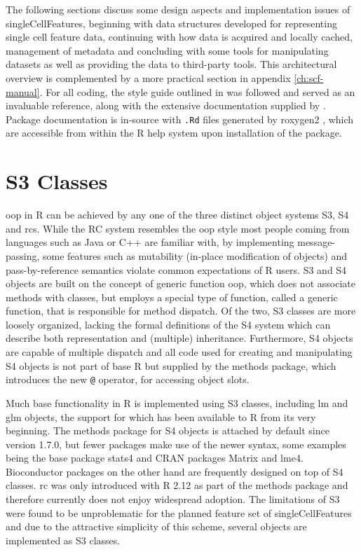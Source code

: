 The following sections discuss some design aspects and implementation issues of singleCellFeatures, beginning with data structures developed for representing single cell feature data, continuing with how data is acquired and locally cached, management of metadata and concluding with some tools for manipulating datasets as well as providing the data to third-party tools. This architectural overview is complemented by a more practical section in appendix \ref{ch:scf-manual}. For all coding, the style guide outlined in \cite{Wickham2014} was followed and \cite{Wickham2015} served as an invaluable reference, along with the extensive documentation supplied by \cite{RCoreTeam2015}. Package documentation is in-source with \texttt{.Rd} files generated by roxygen2 \citep{Wickham2015a}, which are accessible from within the R help system upon installation of the package.

\section{S3 Classes}
\label{sec:s3-objects}
\Gls{oop} in R can be achieved by any one of the three distinct object systems S3, S4 and \glspl{rc}. While the RC system resembles the \gls{oop} style most people coming from languages such as Java or C++ are familiar with, by implementing message-passing, some features such as mutability (in-place modification of objects) and pass-by-reference semantics violate common expectations of R users. S3 and S4 objects are built on the concept of generic function \gls{oop}, which does not associate methods with classes, but employs a special type of function, called a generic function, that is responsible for method dispatch. Of the two, S3 classes are more loosely organized, lacking the formal definitions of the S4 system which can describe both representation and (multiple) inheritance. Furthermore, S4 objects are capable of multiple dispatch and all code used for creating and manipulating S4 objects is not part of base R but supplied by the methods package, which introduces the new \texttt{@} operator, for accessing object slots.

Much base functionality in R is implemented using S3 classes, including lm and glm objects, the support for which has been available to R from its very beginning. The methods package for S4 objects is attached by default since version 1.7.0, but fewer packages make use of the newer syntax, some examples being the base package stats4 and CRAN packages Matrix and lme4. Bioconductor packages on the other hand are frequently designed on top of S4 classes. \Gls{rc} was only introduced with R 2.12 as part of the methods package and therefore currently does not enjoy widespread adoption. The limitations of S3 were found to be unproblematic for the planned feature set of singleCellFeatures and due to the attractive simplicity of this scheme, several objects are implemented as S3 classes.


